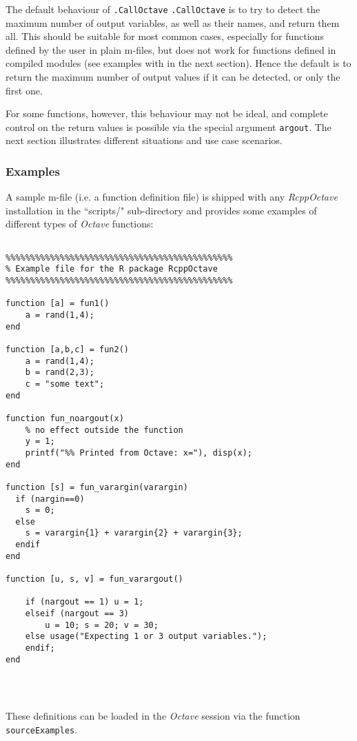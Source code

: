 \documentclass[english,10pt,a4paper]{article}\usepackage{graphicx, color}
\let\proglang=\textit
\let\code=\texttt
\newcommand{\pkgname}[1]{\textit{#1}\xspace}
\newcommand{\octave}{\proglang{Octave}\xspace}
\begin{document}
The default behaviour of \code{.CallOctave} \code{.CallOctave} is to try to
detect the maximum number of output variables, as well as their names, and
return them all.
This should be suitable for most common cases, especially for functions
defined by the user in plain m-files, but does not work for functions defined in
compiled modules (see examples with in the next section).
Hence the default is to return the maximum number of output values if it can be
detected, or only the first one.

For some functions, however, this behaviour may not be ideal, and complete
control on the return values is possible via the special argument \code{argout}.
The next section illustrates different situations and use case scenarios.

\subsubsection{Examples}

A sample m-file (i.e. a function definition file) is shipped with any 
\pkgname{RcppOctave} installation in the ``scripts/" sub-directory and provides
some examples of different types of \octave functions:

\begin{Verbatim}[frame=single]

%%%%%%%%%%%%%%%%%%%%%%%%%%%%%%%%%%%%%%%%%%%%%%
% Example file for the R package RcppOctave
%%%%%%%%%%%%%%%%%%%%%%%%%%%%%%%%%%%%%%%%%%%%%%

function [a] = fun1()
	a = rand(1,4);
end

function [a,b,c] = fun2()
	a = rand(1,4);
	b = rand(2,3);
	c = "some text";
end

function fun_noargout(x) 
	% no effect outside the function
	y = 1;
	printf("%% Printed from Octave: x="), disp(x);
end

function [s] = fun_varargin(varargin)
  if (nargin==0)
	s = 0;
  else
	s = varargin{1} + varargin{2} + varargin{3};
  endif
end

function [u, s, v] = fun_varargout()

	if (nargout == 1) u = 1; 
	elseif (nargout == 3)
		u = 10; s = 20; v = 30; 
	else usage("Expecting 1 or 3 output variables.");
	endif; 
end




\end{Verbatim}

These definitions can be loaded in the \octave session via the function
\code{sourceExamples}.
\end{document}
